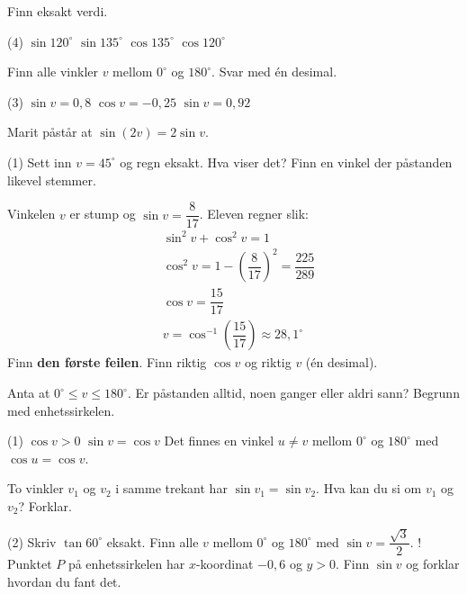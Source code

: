 
Finn eksakt verdi.
\begin{tasks}(4)
  \task $\sin 120^\circ$
  \task $\sin 135^\circ$
  \task $\cos 135^\circ$
  \task $\cos 120^\circ$
\end{tasks}

Finn alle vinkler $v$ mellom $0^\circ$ og $180^\circ$. Svar med én desimal.
\begin{tasks}(3)
  \task $\sin v = 0,8$
  \task $\cos v = -0,25$
  \task $\sin v = 0,92$
\end{tasks}

Marit påstår at $\sin(2v) = 2\sin v$.
\begin{tasks}(1)
  \task Sett inn $v = 45^\circ$ og regn eksakt. Hva viser det?
  \task Finn en vinkel der påstanden likevel stemmer.
\end{tasks}

Vinkelen $v$ er stump og $\sin v = \dfrac{8}{17}$. Eleven regner slik:
\begin{align*}
&\sin^2 v + \cos^2 v = 1\\
&\cos^2 v = 1 - \left(\dfrac{8}{17}\right)^2 = \dfrac{225}{289}\\[4pt]
&\cos v = \dfrac{15}{17}\\[4pt]
&v = \cos^{-1}\!\left(\dfrac{15}{17}\right) \approx 28,1^\circ
\end{align*}
Finn \textbf{den første feilen}. Finn riktig $\cos v$ og riktig $v$ (én desimal).


Anta at $0^\circ \le v \le 180^\circ$. Er påstanden alltid, noen ganger eller aldri sann? Begrunn med enhetssirkelen.
\begin{tasks}(1)
  \task $\cos v > 0$
  \task $\sin v = \cos v$
  \task Det finnes en vinkel $u \neq v$ mellom $0^\circ$ og $180^\circ$ med $\cos u = \cos v$.
\end{tasks}

To vinkler $v_1$ og $v_2$ i samme trekant har $\sin v_1 = \sin v_2$. Hva kan du si om $v_1$ og $v_2$? Forklar.

\begin{sjekk}
\begin{tasks}(2)
  \task Skriv $\tan 60^\circ$ eksakt.
  \task Finn alle $v$ mellom $0^\circ$ og $180^\circ$ med $\sin v = \dfrac{\sqrt3}{2}$.
  \task! Punktet $P$ på enhetssirkelen har $x$-koordinat $-0,6$ og $y > 0$. Finn $\sin v$ og forklar hvordan du fant det.
\end{tasks}
\end{sjekk}
